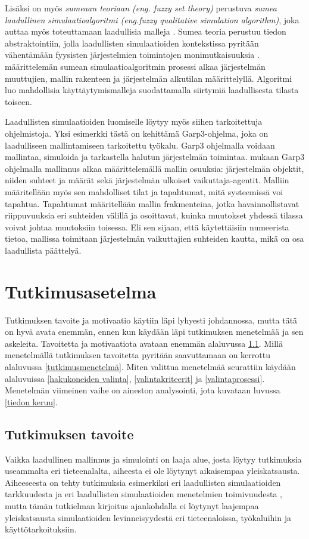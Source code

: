 \documentclass[utf8]{gradu3}
\begin{document}
Lisäksi on myös \textit{sumeaan teoriaan (eng. fuzzy set theory)} 
perustuva \textit{sumea laadullinen simulaatioalgoritmi 
(eng.fuzzy qualitative simulation algorithm)}, 
joka auttaa myös toteuttamaan laadullisia malleja \parencite{shen1993fuzzy}.
Sumea teoria perustuu tiedon abstraktointiin, 
jolla laadullisten simulaatioiden kontekstissa pyritään vähentämään 
fyysisten järjestelmien toimintojen monimutkaisuuksia
\parencite{shen1993fuzzy}. 
\textcite{shen1993fuzzy} määrittelemän sumean simulaatioalgoritmin 
prosessi alkaa järjestelmän muuttujien, 
mallin rakenteen ja järjestelmän alkutilan määrittelyllä. 
Algoritmi luo mahdollisia käyttäytymismalleja suodattamalla siirtymiä laadullisesta tilasta
toiseen.

Laadullisten simulaatioiden luomiselle löytyy myös siihen tarkoitettuja ohjelmistoja.
Yksi esimerkki tästä on \textcite{bredeweg2007garp3} kehittämä Garp3-ohjelma, 
joka on laadulliseen 
mallintamiseen tarkoitettu työkalu. Garp3 ohjelmalla voidaan mallintaa, 
simuloida ja tarkastella halutun järjestelmän toimintaa. 
\textcite{bredeweg2007garp3} mukaan Garp3 ohjelmalla mallinnus alkaa
määrittelemällä mallin osuuksia: 
järjestelmän objektit, niiden suhteet ja määrät sekä järjestelmän ulkoiset vaikuttaja-agentit.
Malliin määritellään myös sen mahdolliset tilat ja tapahtumat, mitä systeemissä voi tapahtua.
Tapahtumat määritellään mallin frakmenteina, 
jotka havainnollistavat riippuvuuksia  eri suhteiden välillä ja osoittavat, 
kuinka muutokset yhdessä tilassa voivat johtaa muutoksiin toisessa.
Eli sen sijaan, että käytettäisiin numeerista tietoa, mallissa toimitaan
järjestelmän vaikuttajien suhteiden kautta, mikä on osa laadullista päättelyä.

\chapter{Tutkimusasetelma}
Tutkimuksen tavoite ja motivaatio käytiin läpi lyhyesti johdannossa, mutta 
tätä on hyvä avata enemmän, ennen kun käydään läpi tutkimuksen menetelmää ja 
sen askeleita. Tavoitetta ja motivaatiota avataan enemmän alaluvussa \ref{tavoite}.
Millä menetelmällä tutkimuksen tavoitetta pyritään saavuttamaan on kerrottu alaluvussa 
\ref{tutkimusmenetelmä}. 
Miten valittua menetelmää seurattiin käydään alaluvuissa 
\ref{hakukoneiden valinta}, \ref{valintakriteerit} ja \ref{valintaprosessi}.
Menetelmän viimeinen vaihe on aineston analysointi, jota kuvataan luvussa
\ref{tiedon keruu}.

 \section{Tutkimuksen tavoite} \label{tavoite}
Vaikka laadullinen mallinnus ja simulointi on laaja alue, 
josta löytyy tutkimuksia useammalta eri tieteenalalta, 
aiheesta ei ole löytynyt aikaisempaa yleiskatsausta. 
Aiheeseesta on tehty tutkimuksia esimerkiksi 
eri laadullisten simulaatioiden tarkkuudesta \parencite{FisherManagmentTechniques2024} 
ja eri laadullisten simulaatioiden menetelmien toimivuudesta
\parencite{qualitativeSimTechniquesAssesment1992}, 
mutta tämän tutkielman kirjoitus ajankohdalla ei löytynyt laajempaa yleiskatsausta 
simulaatioiden levinneisyydestä eri tieteenaloissa, työkaluihin ja käyttötarkoituksiin.  
\end{document}
